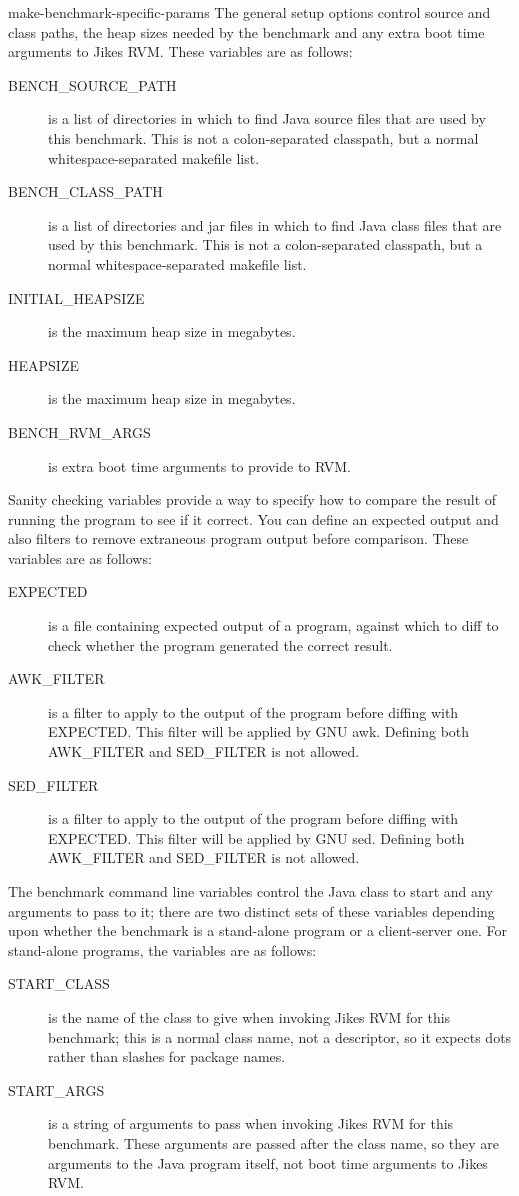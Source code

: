 \begin{description}
\begin{Label}{make-benchmark-specific-params}
 The general setup options control source and class paths, the heap
sizes needed by the benchmark and any extra boot time arguments to
Jikes RVM.  These variables are as follows:
\begin{description}
\item[BENCH\_SOURCE\_PATH] is a list of directories in which to find
Java\TMweb{} source files that are used by this benchmark.  This is not a
colon-separated classpath, but a normal whitespace-separated makefile
list.  
\item[BENCH\_CLASS\_PATH] is a list of directories and jar files in
which to find Java class files that are used by this benchmark.  This
is not a colon-separated classpath, but a normal whitespace-separated
makefile list.  
\item[INITIAL\_HEAPSIZE] is the maximum heap size in megabytes.
\item[HEAPSIZE] is the maximum heap size in megabytes.
\item[BENCH\_RVM\_ARGS] is extra boot time arguments to provide to
RVM. 
\end{description}

 Sanity checking variables provide a way to specify how to compare the
result of running the program to see if it correct.  You can define an
expected output and also filters to remove extraneous program output
before comparison.  These variables are as follows:
\begin{description}
\item[EXPECTED] is a file containing expected output of a program,
against which to diff to check whether the program generated the
correct result.
\item[AWK\_FILTER] is a filter to apply to the output of the program
before diffing with EXPECTED.  This filter will be applied by GNU
awk. Defining both AWK\_FILTER and SED\_FILTER is not
allowed. 
\item[SED\_FILTER] is a filter to apply to the output of the program
before diffing with EXPECTED.  This filter will be applied by GNU sed.
Defining both AWK\_FILTER and SED\_FILTER is not allowed. 
\end{description}

 The benchmark command line variables control the Java class to start
and any arguments to pass to it; there are two distinct sets of these
variables depending upon whether the benchmark is a stand-alone program
or a client-server one.  For stand-alone programs, the variables are as
follows: 
\begin{description}
\item[START\_CLASS] is the name of the class to give when invoking
Jikes RVM
for this benchmark; this is a normal class name, not a descriptor, so
it expects dots rather than slashes for package names.
\item[START\_ARGS] is a string of arguments to pass when invoking
Jikes RVM
for this benchmark.  These arguments are passed after the class name,
so they are arguments to the Java program itself, not boot time
arguments to Jikes RVM.
\end{description}


\end{Label}
\end{description}
